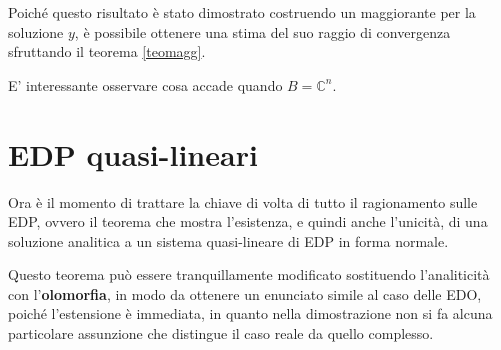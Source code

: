 Poiché questo risultato è stato dimostrato costruendo un maggiorante per la soluzione $y$, è possibile ottenere una stima del suo raggio di convergenza sfruttando il teorema \ref{teomagg}.

\begin{theorem}
\end{theorem}

\begin{remark}
E' interessante osservare cosa accade quando $B=\mathbb{C}^n$.
\end{remark}




\newpage
\section{EDP quasi-lineari}

Ora è il momento di trattare la chiave di volta di tutto il ragionamento sulle EDP, ovvero il teorema che mostra l'esistenza, e quindi anche l'unicità, di una soluzione analitica a un sistema quasi-lineare di EDP in forma normale.

\begin{theorem}\label{teoquasilin}
\end{theorem}

\begin{remark}
Questo teorema può essere tranquillamente modificato sostituendo l'analiticità con l'\textbf{olomorfia}, in modo da ottenere un enunciato simile al caso delle EDO, poiché l'estensione è immediata, in quanto nella dimostrazione non si fa alcuna particolare assunzione che distingue il caso reale da quello complesso.
\end{remark}



